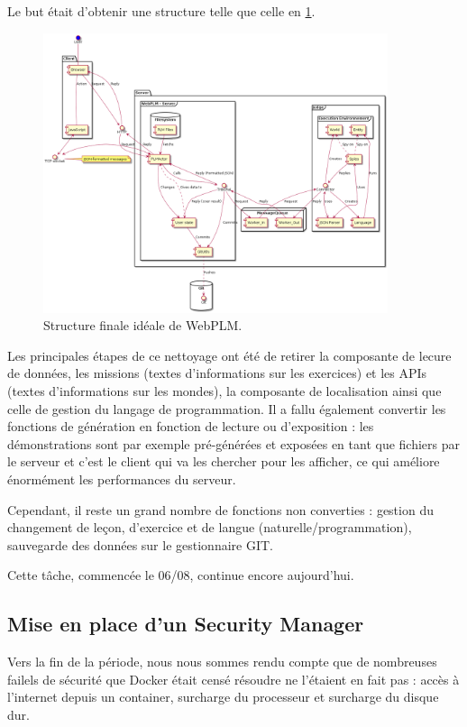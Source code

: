 \documentclass[stage]{tnreport}
\begin{document}
Le but était d'obtenir une structure telle que celle en \ref{fig:wplmUP4}.

\begin{figure}[h]
	\centering
		\includegraphics[width=0.9\textwidth]{figures/WebPLM-uml-cp4}
	\caption{Structure finale idéale de WebPLM.}
	\label{fig:wplmUP4}
\end{figure}

Les principales étapes de ce nettoyage ont été de retirer la composante de lecure de données, les missions (textes d'informations sur les exercices) et les APIs (textes d'informations sur les mondes), la composante de localisation ainsi que celle de gestion du langage de programmation. Il a fallu également convertir les fonctions de génération en fonction de lecture ou d'exposition : les démonstrations sont par exemple pré-générées et exposées en tant que fichiers par le serveur et c'est le client qui va les chercher pour les afficher, ce qui améliore énormément les performances du serveur.

Cependant, il reste un grand nombre de fonctions non converties : gestion du changement de leçon, d'exercice et de langue (naturelle/programmation), sauvegarde des données sur le gestionnaire GIT.

Cette tâche, commencée le 06/08, continue encore aujourd'hui.

\subsection{Mise en place d'un Security Manager}

Vers la fin de la période, nous nous sommes rendu compte que de nombreuses failels de sécurité que Docker était censé résoudre ne l'étaient en fait pas : accès à l'internet depuis un container, surcharge du processeur et surcharge du disque dur.
\end{document}
